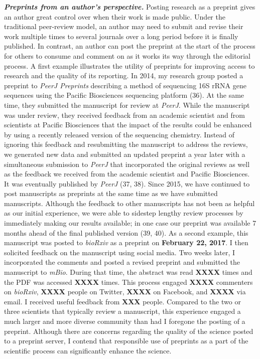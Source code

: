 \documentclass[11pt,]{article}
\begin{document}
\textbf{\emph{Preprints from an author's perspective.}} Posting research
as a preprint gives an author great control over when their work is made
public. Under the traditional peer-review model, an author may need to
submit and revise their work multiple times to several journals over a
long period before it is finally published. In contrast, an author can
post the preprint at the start of the process for others to consume and
comment on as it works its way through the editorial process. A first
example illustrates the utility of preprints for improving access to
research and the quality of its reporting. In 2014, my research group
posted a preprint to \emph{PeerJ Preprints} describing a method of
sequencing 16S rRNA gene sequences using the Pacific Biosciences
sequencing platform (36). At the same time, they submitted the
manuscript for review at \emph{PeerJ}. While the manuscript was under
review, they received feedback from an academic scientist and from
scientists at Pacific Biosciences that the impact of the results could
be enhanced by using a recently released version of the sequencing
chemistry. Instead of ignoring this feedback and resubmitting the
manuscript to address the reviews, we generated new data and submitted
an updated preprint a year later with a simultaneous submission to
\emph{PeerJ} that incorporated the original reviews as well as the
feedback we received from the academic scientist and Pacific
Biosciences. It was eventually published by \emph{PeerJ} (37, 38). Since
2015, we have continued to post manuscripts as preprints at the same
time as we have submitted manuscripts. Although the feedback to other
manuscripts has not been as helpful as our initial experience, we were
able to sidestep lengthy review processes by immediately making our
results available; in one case our preprint was available 7 months ahead
of the final published version (39, 40). As a second example, this
manuscript was posted to \emph{bioRxiv} as a preprint on
\textbf{February 22, 2017}. I then solicited feedback on the manuscript
using social media. Two weeks later, I incorporated the comments and
posted a revised preprint and submitted the manuscript to \emph{mBio}.
During that time, the abstract was read \textbf{XXXX} times and the PDF
was accessed \textbf{XXXX} times. This process engaged \textbf{XXXX}
commenters on \emph{bioRxiv}, \textbf{XXXX} people on Twitter,
\textbf{XXXX} on Facebook, and \textbf{XXXX} via email. I received
useful feedback from \textbf{XXX} people. Compared to the two or three
scientists that typically review a manuscript, this experience engaged a
much larger and more diverse community than had I foregone the posting
of a preprint. Although there are concerns regarding the quality of the
science posted to a preprint server, I contend that responsible use of
preprints as a part of the scientific process can significantly enhance
the science.
\end{document}
